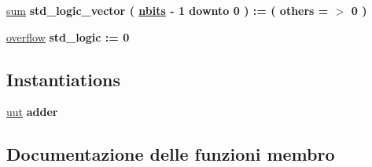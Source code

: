 \begin{DoxyCompactItemize}
\item 
\hyperlink{classtb__adder_1_1behavior_a5db139547621616405be3e820278d444}{sum} {\bfseries \textcolor{vhdlchar}{std\+\_\+logic\+\_\+vector}\textcolor{vhdlchar}{ }\textcolor{vhdlchar}{(}\textcolor{vhdlchar}{ }\textcolor{vhdlchar}{ }\textcolor{vhdlchar}{ }\textcolor{vhdlchar}{ }{\bfseries \hyperlink{classtb__adder_1_1behavior_aff8823a253db156c5a7a40d1b813343f}{nbits}} \textcolor{vhdlchar}{-\/}\textcolor{vhdlchar}{ } \textcolor{vhdldigit}{1} \textcolor{vhdlchar}{ }\textcolor{vhdlchar}{downto}\textcolor{vhdlchar}{ }\textcolor{vhdlchar}{ } \textcolor{vhdldigit}{0} \textcolor{vhdlchar}{ }\textcolor{vhdlchar}{)}\textcolor{vhdlchar}{ }\textcolor{vhdlchar}{ }\textcolor{vhdlchar}{ }\textcolor{vhdlchar}{\+:}\textcolor{vhdlchar}{=}\textcolor{vhdlchar}{ }\textcolor{vhdlchar}{(}\textcolor{vhdlchar}{ }\textcolor{vhdlchar}{ }\textcolor{vhdlchar}{others}\textcolor{vhdlchar}{ }\textcolor{vhdlchar}{ }\textcolor{vhdlchar}{=}\textcolor{vhdlchar}{ }\textcolor{vhdlchar}{$>$}\textcolor{vhdlchar}{ }\textcolor{vhdlchar}{\textquotesingle{}}\textcolor{vhdlchar}{ } \textcolor{vhdldigit}{0} \textcolor{vhdlchar}{ }\textcolor{vhdlchar}{\textquotesingle{}}\textcolor{vhdlchar}{ }\textcolor{vhdlchar}{)}\textcolor{vhdlchar}{ }} 
\item 
\hyperlink{classtb__adder_1_1behavior_ab579763af0d4bea3c24be9431798eeea}{overflow} {\bfseries \textcolor{vhdlchar}{std\+\_\+logic}\textcolor{vhdlchar}{ }\textcolor{vhdlchar}{ }\textcolor{vhdlchar}{\+:}\textcolor{vhdlchar}{=}\textcolor{vhdlchar}{ }\textcolor{vhdlchar}{ }\textcolor{vhdlchar}{\textquotesingle{}}\textcolor{vhdlchar}{ } \textcolor{vhdldigit}{0} \textcolor{vhdlchar}{ }\textcolor{vhdlchar}{\textquotesingle{}}\textcolor{vhdlchar}{ }} 
\end{DoxyCompactItemize}
\subsection*{Instantiations}
 \begin{DoxyCompactItemize}
\item 
\hyperlink{classtb__adder_1_1behavior_a1619316ad715601eb5d3559db829ac05}{uut}  {\bfseries adder}   
\end{DoxyCompactItemize}


\subsection{Documentazione delle funzioni membro}
\mbox{\label{classtb__adder_1_1behavior_ad2efa6785cff833c341e27596b21aeb5}} 
